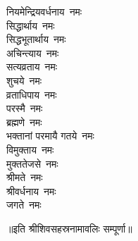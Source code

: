\begin{multicols}{2}
\begin{flushleft}
नियमेन्द्रियवर्धनाय~नमः\\
सिद्धार्थाय~नमः\\
सिद्धभूतार्थाय~नमः\\
अचिन्त्याय~नमः\\
सत्यव्रताय~नमः\\
शुचये~नमः\\
व्रताधिपाय~नमः\hfill{}\\
परस्मै~नमः\\
ब्रह्मणे~नमः\\
भक्तानां परमायै गतये~नमः\\
विमुक्ताय~नमः\\
मुक्ततेजसे~नमः\\
श्रीमते~नमः\\
श्रीवर्धनाय~नमः\\
जगते~नमः\\
\end{flushleft}
\end{multicols}
\centerline{॥इति श्रीशिवसहस्रनामावलिः सम्पूर्णा॥}
